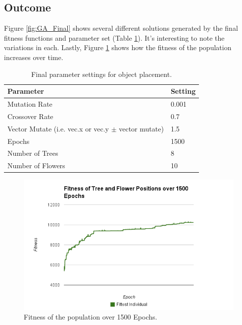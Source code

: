 \subsection{Outcome}
Figure \ref{fig:GA_Final} shows several different solutions generated by the final fitness functions and 
parameter set (Table \ref{table:params}).
It's interesting to note the variations in each. Lastly, Figure \ref{fig:fitnessOverTime} shows
how the fitness of the population increases over time.

\begin{table}[h]
	\centering
    \begin{tabular}{ | l | l |}
    \hline
    Parameter & Setting \\ \hline
    Mutation Rate & 0.001    \\ \hline
    Crossover Rate & 0.7    \\ \hline
    Vector Mutate (i.e. vec.x or vec.y $\pm$ vector mutate) & 1.5    \\ \hline
    Epochs & 1500    \\ \hline
    Number of Trees & 8    \\ \hline
    Number of Flowers & 10    \\ \hline
    \end{tabular}
    \caption{Final parameter settings for object placement.}
    \label{table:params}
\end{table}

\begin{figure}[h]
\centering
\includegraphics[width=0.7\linewidth]{./timeFitness}
\caption{Fitness of the population over 1500 Epochs.}
\label{fig:fitnessOverTime}
\end{figure}

